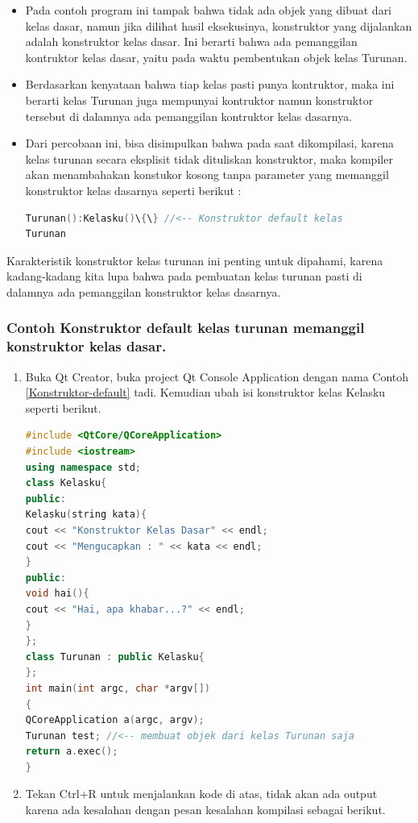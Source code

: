 \begin{itemize}
\item
  Pada contoh program ini tampak bahwa tidak ada objek yang dibuat dari
  kelas dasar, namun jika dilihat hasil eksekusinya, konstruktor yang
  dijalankan adalah konstruktor kelas dasar. Ini berarti bahwa ada
  pemanggilan kontruktor kelas dasar, yaitu pada waktu pembentukan objek
  kelas Turunan.
\item
  Berdasarkan kenyataan bahwa tiap kelas pasti punya kontruktor, maka
  ini berarti kelas Turunan juga mempunyai kontruktor namun konstruktor
  tersebut di dalamnya ada pemanggilan kontruktor kelas dasarnya.
\item
  Dari percobaan ini, bisa disimpulkan bahwa pada saat dikompilasi,
  karena kelas turunan secara eksplisit tidak dituliskan konstruktor,
  maka kompiler akan menambahakan konstukor kosong tanpa parameter yang
  memanggil konstruktor kelas dasarnya seperti berikut :

\begin{lstlisting}[language=c++, numbers=none]
Turunan():Kelasku()\{\} //<-- Konstruktor default kelas
Turunan
\end{lstlisting}
  
\end{itemize}

Karakteristik konstruktor kelas turunan ini penting untuk dipahami,
karena kadang-kadang kita lupa bahwa pada pembuatan kelas turunan pasti
di dalamnya ada pemanggilan konstruktor kelas dasarnya.

\subsubsection*{Contoh  Konstruktor default kelas turunan memanggil konstruktor kelas dasar.}

\begin{enumerate}

\item
  Buka Qt Creator, buka project Qt Console Application dengan nama
  Contoh \ref{Konstruktor-default} tadi. Kemudian ubah isi konstruktor kelas Kelasku seperti
  berikut.

\begin{lstlisting}[language=c++, caption=Konstruktor default kelas turunan memanggil konstruktor kelas dasar, label=Konstruktor-default-kelas-turunan-memanggil-konstruktor-kelas-dasar]
#include <QtCore/QCoreApplication>
#include <iostream>
using namespace std;
class Kelasku{
public:
Kelasku(string kata){
cout << "Konstruktor Kelas Dasar" << endl;
cout << "Mengucapkan : " << kata << endl;
}
public:
void hai(){
cout << "Hai, apa khabar...?" << endl;
}
};
class Turunan : public Kelasku{
};
int main(int argc, char *argv[])
{
QCoreApplication a(argc, argv);
Turunan test; //<-- membuat objek dari kelas Turunan saja
return a.exec();
}
\end{lstlisting}
\item
  Tekan Ctrl+R untuk menjalankan kode di atas, tidak akan ada output
  karena ada kesalahan dengan pesan kesalahan kompilasi sebagai berikut.
\end{enumerate}

